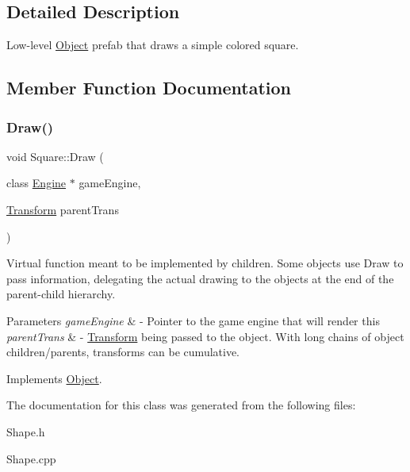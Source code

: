 \subsection{Detailed Description}
Low-\/level \hyperlink{class_object}{Object} prefab that draws a simple colored square. 

\subsection{Member Function Documentation}
\hypertarget{class_square_a9a533e0dd001a0b883bea5145c7444e0}{}\label{class_square_a9a533e0dd001a0b883bea5145c7444e0} 
\subsubsection{\texorpdfstring{Draw()}{Draw()}}
{\footnotesize\ttfamily void Square\+::\+Draw (\begin{DoxyParamCaption}\item[{class \hyperlink{class_engine}{Engine} $\ast$}]{game\+Engine,  }\item[{\hyperlink{class_transform}{Transform}}]{parent\+Trans }\end{DoxyParamCaption})\hspace{0.3cm}{\ttfamily [virtual]}}



Virtual function meant to be implemented by children. Some objects use Draw to pass information, delegating the actual drawing to the objects at the end of the parent-\/child hierarchy. 


\begin{DoxyParams}{Parameters}
{\em game\+Engine} & -\/ Pointer to the game engine that will render this \\
\hline
{\em parent\+Trans} & -\/ \hyperlink{class_transform}{Transform} being passed to the object. With long chains of object children/parents, transforms can be cumulative. \\
\hline
\end{DoxyParams}


Implements \hyperlink{class_object_adeb7a19aaca51dbf093b37fd21c5e41f}{Object}.



The documentation for this class was generated from the following files\+:\begin{DoxyCompactItemize}
\item 
Shape.\+h\item 
Shape.\+cpp\end{DoxyCompactItemize}
